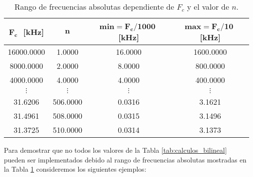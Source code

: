 \begin{table}[!hbp]                                      
\centering   
\caption{Rango de frecuencias absolutas dependiente de $F_{c}$ y el valor de $n$.}                            
\label{tab:frecuencias_absolutas}                                        
\begin{tabular}{cccc}                        
\hline                                              
$\bm{F_{c}}\,\,$ [kHz] & $\bm{n}$ & \textbf{min}$\bm{=F_{c} / 1000}\,\,$ [kHz] & \textbf{max}$\bm{=F_{c} /10}\,\,$ [kHz] \\                    
\hline                                              
16000.0000 & 1.0000 & 16.0000 & 1600.0000 \\
                                     
8000.0000 & 2.0000 & 8.0000 & 800.0000 \\   
                                     
4000.0000 & 4.0000 & 4.0000 & 400.0000 \\   

$\vdots$ & $\vdots$ & $\vdots$ & $\vdots$ \\  
 
31.6206 & 506.0000 & 0.0316 & 3.1621 \\     
                                    
31.4961 & 508.0000 & 0.0315 & 3.1496 \\     
                                    
31.3725 & 510.0000 & 0.0314 & 3.1373 \\      
\hline                                           
\end{tabular}                                                                
\end{table} 

Para demostrar que no todos los valores de la Tabla \ref{tab:calculos_bilineal} pueden ser implementados debido al rango de frecuencias absolutas mostradas en la Tabla \ref{tab:frecuencias_absolutas} consideremos los siguientes ejemplos:

